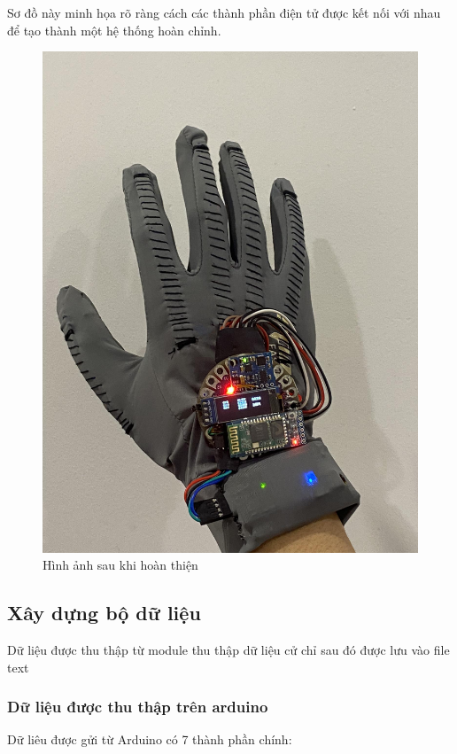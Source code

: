 Sơ đồ này minh họa rõ ràng cách các thành phần điện tử được kết nối với nhau để tạo thành một hệ thống hoàn chỉnh.
\begin{figure}[H]
    \centering
    \includegraphics[width=\textwidth,height=\textheight,keepaspectratio]{Images/SystemImpl/full.jpg}
    \caption{Hình ảnh sau khi hoàn thiện}
    \label{fig:enter-label}
\end{figure}
\subsection{Xây dựng bộ dữ liệu}
Dữ liệu được thu thập từ module thu thập dữ liệu cử chỉ sau đó được lưu vào file text
\subsubsection{Dữ liệu được thu thập trên arduino}

Dữ liêu được gửi từ Arduino có 7 thành phần chính: 

